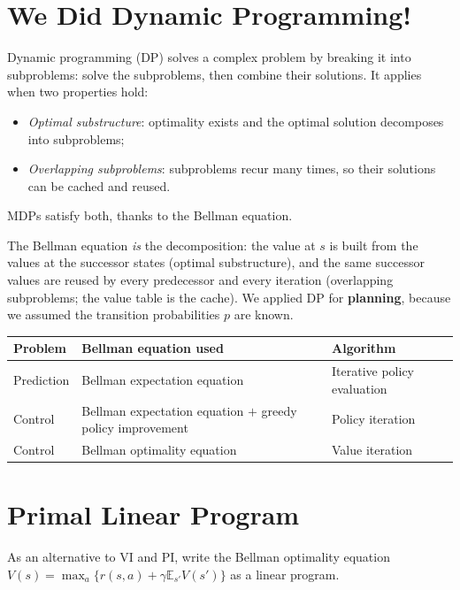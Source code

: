 \documentclass[11pt,a4paper]{article}
\newcommand{\E}{\mathbb{E}}
\theoremstyle{plain}
\theoremstyle{definition}
\theoremstyle{remark}
\begin{document}
\section{We Did Dynamic Programming!}
Dynamic programming (DP) solves a complex problem by breaking it into subproblems: solve the subproblems, then combine their solutions. It applies when two properties hold:
\begin{itemize}[itemsep=1pt]
\item \emph{Optimal substructure}: optimality exists and the optimal solution decomposes into subproblems;
\item \emph{Overlapping subproblems}: subproblems recur many times, so their solutions can be cached and reused.
\end{itemize}
MDPs satisfy both, thanks to the Bellman equation.

\begin{intuition}
The Bellman equation \emph{is} the decomposition: the value at $s$ is built from the values at the successor states (optimal substructure), and the same successor values are reused by every predecessor and every iteration (overlapping subproblems; the value table is the cache). We applied DP for \textbf{planning}, because we assumed the transition probabilities $p$ are known.
\end{intuition}

\begin{center}
\begin{tabular}{@{}p{2cm}p{6.6cm}p{4.4cm}@{}}\toprule
\textbf{Problem} & \textbf{Bellman equation used} & \textbf{Algorithm}\\\midrule
Prediction & Bellman expectation equation & Iterative policy evaluation\\
Control & Bellman expectation equation $+$ greedy policy improvement & Policy iteration\\
Control & Bellman optimality equation & Value iteration\\\bottomrule
\end{tabular}
\end{center}

\section{Primal Linear Program}
As an alternative to VI and PI, write the Bellman optimality equation $V(s)=\max_a\{r(s,a)+\gamma\E_{s'}V(s')\}$ as a linear program.
\end{document}

